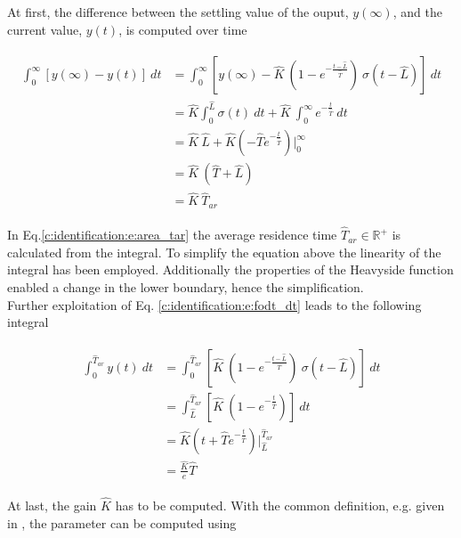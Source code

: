 At first, the difference between the settling value of the ouput, $y(\infty)$, and the current value, $y(t)$, is computed over time

\begin{align}
\begin{split}
\int_0^\infty \left[ y(\infty)-y(t) \right] ~dt &= \int_0^\infty \left[ y(\infty) - \hat{K} ~\left( 1 - e^{-\frac{t- \hat{L}}{\hat{T}}}\right)~ \sigma(t-\hat{L}) \right] ~dt \\
&= \hat{K} {\int_0^\hat{L}} \sigma(t) ~dt + \hat{K}~{\int^\infty_0} e^{-\frac{t}{\hat{T}}} ~dt \\
&= \hat{K}~\hat{L} + \hat{K} \left( -\hat{T} e^{-\frac{t}{\hat{T}}}\right) \Bigg\rvert^\infty_0 \\
&= \hat{K}~\left(\hat{T}+\hat{L}\right) \\
&= \hat{K}~\hat{T}_{ar}
\end{split}
\label{c:identification:e:area_tar}
\end{align}

In Eq.\ref{c:identification:e:area_tar} the average residence time $\hat{T}_{ar} \in \mathbb{R}^+$ is calculated from the integral. To simplify the equation above the linearity of the integral has been employed. Additionally the properties of the Heavyside function enabled a change in the lower boundary, hence the simplification.\\

Further exploitation of Eq. \ref{c:identification:e:fodt_dt} leads to the following integral

\begin{align}
\begin{split}
\int_0^{\hat{T}_{ar}} y(t) ~dt &= \int_0^{\hat{T}_{ar}} \left[ \hat{K} ~\left( 1 - e^{-\frac{t- \hat{L}}{\hat{T}}}\right)~ \sigma(t-\hat{L}) \right] ~dt \\
&= \int_{\hat{L}}^{\hat{T}_{ar}} \left[ \hat{K} ~\left( 1 - e^{-\frac{t}{\hat{T}}}\right) \right]~dt \\
&= \hat{K} \left( t + \hat{T} e^{-\frac{t}{\hat{T}}} \right) \Bigg\rvert_{\hat{L}}^{\hat{T}_{ar}} \\
&= \frac{\hat{K}}{e} \hat{T}
\end{split}
\label{c:identification:e:area_t}
\end{align}

At last, the gain $\hat{K}$ has to be computed. With the common definition, e.g. given in \cite[p.213]{Lunze2016}, the parameter can be computed using

